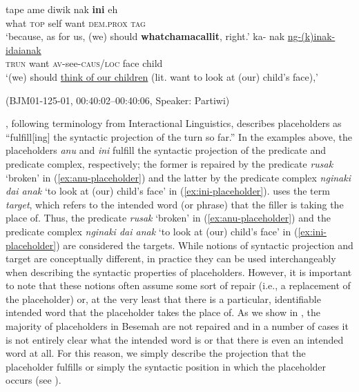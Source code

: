 \documentclass[output=paper,
\ChapterDOI{10.5281/zenodo.15697583}
colorlinks,
citecolor=brown]{langscibook}
\begin{document}
\begin{exe}
    \ex\label{ex:ini-placeholder} 
    \begin{xlist}[0\quad →A:]
        \gll tape ame diwik nak \textbf{ini} eh\\
        what \textsc{top} self want \textsc{dem.prox} \textsc{tag}\\
        \trans `because, as for us, (we) should \textbf{whatchamacallit}, right.'
        \exi{2\quad \hphantom{→P:}}
        \gll ka- nak \uline{ng-(k)inak-idai\hphantom{e }anak}\\
        \textsc{trun} want {\textsc{av}-see-\textsc{caus/loc} face child}\\
        \trans `(we) should \uline{think of our children} (lit. want to look at (our) child's face),'
    \end{xlist}
    \hfill (BJM01-125-01, 00:40:02--00:40:06, Speaker: Partiwi)
\end{exe}

\textcite[][2]{fox2010introduction}, following terminology from Interactional Linguistics, describes placeholders as ``fulfill[ing] the syntactic projection of the turn so far.'' In the examples above, the placeholders \textit{anu} and \textit{ini} fulfill the syntactic projection of the predicate and predicate complex, respectively; the former is repaired by the predicate \textit{rusak} `broken' in (\ref{ex:anu-placeholder}) and the latter by the predicate complex \textit{nginaki dai anak} `to look at (our) child's face' in (\ref{ex:ini-placeholder}). \textcite{podlesskaya2010parameters} uses the term \textit{target}, which refers to the intended word (or phrase) that the filler is taking the place of. Thus, the predicate \textit{rusak} `broken' in (\ref{ex:anu-placeholder}) and the predicate complex \textit{nginaki dai anak} `to look at (our) child's face' in (\ref{ex:ini-placeholder}) are considered the targets. While notions of syntactic projection and target are conceptually different, in practice they can be used interchangeably when describing the syntactic properties of placeholders. However, it is important to note that these notions often assume some sort of repair (i.e., a replacement of the placeholder) or, at the very least that there is a particular, identifiable intended word that the placeholder takes the place of. As we show in , the majority of placeholders in Besemah are not repaired and in a number of cases it is not entirely clear what the intended word is or that there is even an intended word at all. For this reason, we simply describe the projection that the placeholder fulfills or simply the syntactic position in which the placeholder occurs (see ).
\end{document}
